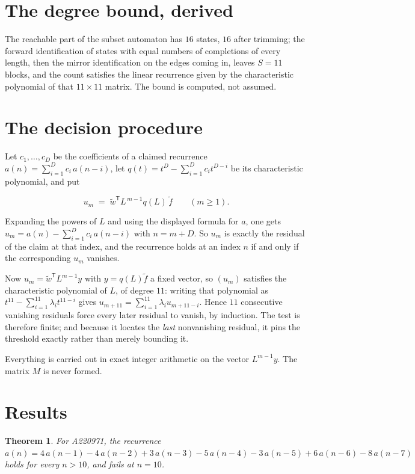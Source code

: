 \documentclass[11pt]{article}
\newtheorem{theorem}{Theorem}
\theoremstyle{definition}
\begin{document}
\section{The degree bound, derived}

The reachable part of the subset automaton has $16$ states, $16$ after trimming; the forward identification of states with equal numbers of completions of every length, then the mirror identification on the edges coming in, leaves $S = 11$ blocks, and the count satisfies the linear recurrence given by the characteristic polynomial of that $11\times11$ matrix. The bound is computed, not assumed.

\section{The decision procedure}

Let $c_1,\dots,c_D$ be the coefficients of a claimed recurrence $a(n) = \sum_{i=1}^{D} c_i\,a(n-i)$, let $q(t) = t^{D} - \sum_{i=1}^{D} c_i t^{D-i}$ be its characteristic polynomial, and put

\[u_m \;=\; \tilde w^{\mathsf T} L^{\,m-1} q(L)\,\tilde f \qquad (m \ge 1).\]

Expanding the powers of $L$ and using the displayed formula for $a$, one gets $u_m = a(n) - \sum_{i=1}^{D} c_i\,a(n-i)$ with $n = m + D$. So $u_m$ is exactly the residual of the claim at that index, and the recurrence holds at an index $n$ if and only if the corresponding $u_m$ vanishes.

Now $u_m = \tilde w^{\mathsf T} L^{m-1} y$ with $y = q(L)\tilde f$ a fixed vector, so $(u_m)$ satisfies the characteristic polynomial of $L$, of degree $11$: writing that polynomial as $t^{11} - \sum_{i=1}^{11} \lambda_i t^{11-i}$ gives $u_{m+11} = \sum_{i=1}^{11} \lambda_i u_{m+11-i}$. Hence $11$ consecutive vanishing residuals force every later residual to vanish, by induction. The test is therefore finite; and because it locates the {\itshape last} nonvanishing residual, it pins the threshold exactly rather than merely bounding it.

Everything is carried out in exact integer arithmetic on the vector $L^{m-1}y$. The matrix $M$ is never formed.

\section{Results}

\begin{theorem} For A220971, the recurrence $a(n) = 4\,a(n-1) - 4\,a(n-2) + 3\,a(n-3) - 5\,a(n-4) - 3\,a(n-5) + 6\,a(n-6) - 8\,a(n-7)$ holds for every $n > 10$, and fails at $n = 10$.\end{theorem}
\end{document}
